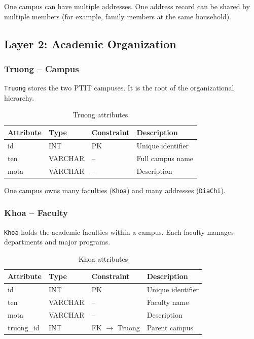 \documentclass[12pt,a4paper]{report}
\begin{document}
One campus can have multiple addresses. One address record can be shared by multiple members (for example, family members at the same household).

\subsection{Layer 2: Academic Organization}

\subsubsection{Truong -- Campus}

\texttt{Truong} stores the two PTIT campuses. It is the root of the organizational hierarchy.

\begin{table}[H]
\renewcommand{\arraystretch}{1.35}
\caption{Truong attributes}
\label{tab:truong}
\begin{tabular}{|p{3cm}|p{2.5cm}|p{2.5cm}|p{5.5cm}|}
  \hline
  \textbf{Attribute} & \textbf{Type} & \textbf{Constraint} & \textbf{Description} \\
  \hline
  id & INT & PK & Unique identifier \\
  \hline
  ten & VARCHAR & -- & Full campus name \\
  \hline
  mota & VARCHAR & -- & Description \\
  \hline
\end{tabular}
\end{table}

One campus owns many faculties (\texttt{Khoa}) and many addresses (\texttt{DiaChi}).

\subsubsection{Khoa -- Faculty}

\texttt{Khoa} holds the academic faculties within a campus. Each faculty manages departments and major programs.

\begin{table}[H]
\renewcommand{\arraystretch}{1.35}
\caption{Khoa attributes}
\label{tab:khoa}
\begin{tabular}{|p{3cm}|p{2.5cm}|p{2.5cm}|p{5.5cm}|}
  \hline
  \textbf{Attribute} & \textbf{Type} & \textbf{Constraint} & \textbf{Description} \\
  \hline
  id & INT & PK & Unique identifier \\
  \hline
  ten & VARCHAR & -- & Faculty name \\
  \hline
  mota & VARCHAR & -- & Description \\
  \hline
  truong\_id & INT & FK $\to$ Truong & Parent campus \\
  \hline
\end{tabular}
\end{table}
\end{document}
